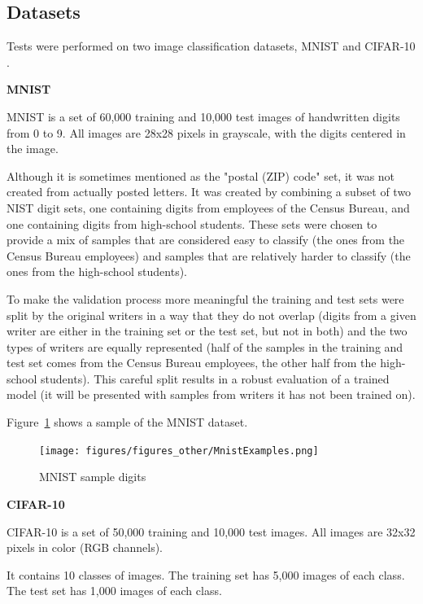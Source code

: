 \documentclass[../CAP6619_term_project_cgarbin.tex]{subfiles}
\begin{document}
\subsection{Datasets}

Tests were performed on two image classification datasets, MNIST \cite{LeCun1999} and CIFAR-10 \cite{Krizhevsky2009}.

\medskip
\textbf{MNIST}

MNIST \cite{LeCun1999} is a set of 60,000 training and 10,000 test images of handwritten digits from 0 to 9. All images are 28x28 pixels in grayscale, with the digits centered in the image.

Although it is sometimes mentioned as the "postal (ZIP) code" set, it was not created from actually posted letters. It was created by combining a subset of two NIST digit sets, one containing digits from employees of the Census Bureau, and one containing digits from high-school students. These sets were chosen to provide a mix of samples that are considered easy to classify (the ones from the Census Bureau employees) and samples that are relatively harder to classify (the ones from the high-school students).

To make the validation process more meaningful the training and test sets were split by the original writers in a way that they do not overlap (digits from a given writer are either in the training set or the test set, but not in both) and the two types of writers are equally represented (half of the samples in the training and test set comes from the Census Bureau employees, the other half from the high-school students). This careful split results in a robust evaluation of a trained model (it will be presented with samples from writers it has not been trained on).

Figure~\ref{fig:MnistSample} shows a sample of the MNIST dataset.

\begin{figure}[!htbp]
\centerline{\texttt{[image: figures/figures\_other/MnistExamples.png]}}
\caption{MNIST sample digits \cite{Steppana}}
\label{fig:MnistSample}
\end{figure}

\medskip
\textbf{CIFAR-10}

CIFAR-10 \cite{Krizhevsky2009} is a set of 50,000 training and 10,000 test images. All images are 32x32 pixels in color (RGB channels).

It contains 10 classes of images. The training set has 5,000 images of each class. The test set has 1,000 images of each class.
\end{document}
